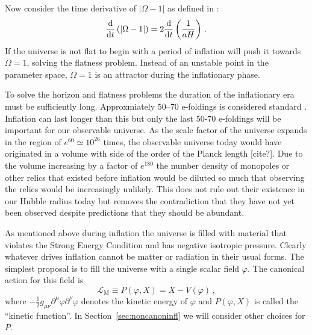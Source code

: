 Now consider the time derivative of $|\Omega -1|$ as defined in
:
% 
\begin{equation}
 \label{eq:omegaderiv-intro}
 \frac{\mathrm{d}}{\mathrm{d} t}\left(|\Omega -1 |\right) = 2\frac{\mathrm{d}}{\mathrm{d} t}
\left(\frac{1}{aH}\right)\,.
\end{equation}
% 
If the universe is not flat to begin with a period of inflation will push it
towards $\Omega=1$, solving the flatness problem. Instead of an unstable point
in the parameter space, $\Omega=1$ is an attractor during the inflationary
phase. 
% 

To solve the horizon and flatness problems the duration of the inflationary era
must be
sufficiently long. Approxmiately $50$--$70$ e-foldings is considered standard
\cite{book:liddle}. Inflation
can last longer than this but only the last 50-70 e-foldings will be important
for our observable universe. As the scale factor of the universe expands
in the region of $e^{60}\simeq 10^{26}$ times, the observable universe
today would
have originated in a volume with side of the order of the Planck length [cite?].
Due to the volume increasing by a factor of $e^{180}$ the number density
of monopoles or other relics that existed before inflation would be
diluted so much that observing the relics would be increasingly unlikely. This
does not rule out their existence in our Hubble radius today but removes the
contradiction that they have not yet been observed despite predictions that
they should be abundant.


As mentioned above during inflation the universe is filled with material that
violates the Strong Energy Condition and has negative isotropic pressure.
Clearly whatever drives inflation cannot be matter or radiation in their usual
forms. The simplest proposal is to fill the universe with a single scalar field
$\varphi$. The canonical action for this field is
\begin{equation}
\label{eq:phiaction-intro}
 \mathcal{L}_\mathrm{M} \equiv P(\varphi, X) = X -V(\varphi) \,,
\end{equation}
where $-\frac{1}{2}g_{\mu\nu}\partial^\mu\varphi \partial^\nu\varphi$ denotes
the kinetic energy of $\varphi$ and $P(\varphi, X)$ is called the ``kinetic
function''. In Section~\ref{sec:noncanoninfl} we will consider other
choices for $P$. 

